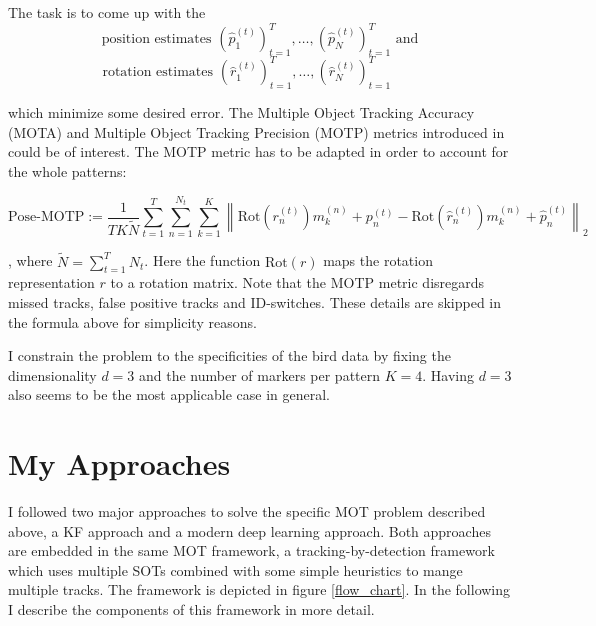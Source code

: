 \documentclass[12pt,a4paper]{article}
\begin{document}
The task is to come up with the $$ \text{ position estimates } \left(\hat{p}^{(t)}_1\right)_{t=1}^T, \dots,\left(\hat{p}^{(t)}_N\right)_{t=1}^T \text{ and }$$ $$\text{ rotation estimates } \left(\hat{r}^{(t)}_1\right)_{t=1}^T, \dots,\left(\hat{r}^{(t)}_N\right)_{t=1}^T \qquad ~$$ 
\begin{sloppypar}
which minimize some desired error. The Multiple Object Tracking Accuracy (MOTA) and Multiple Object Tracking Precision (MOTP) metrics introduced in \cite{mot_metrics} could be of interest. The MOTP metric has to be adapted in order to account for the whole patterns:
\end{sloppypar}

\begin{equation}
	\text{Pose-MOTP} := \frac{1}{TK\tilde{N}}\sum_{t=1}^{T}\sum_{n=1}^{N_t} \sum_{k=1}^{K} \left\| \text{Rot}(r^{(t)}_n)m^{(n)}_k + p^{(t)}_n - \text{Rot}(\hat{r}^{(t)}_n)m^{(n)}_k + \hat{p}^{(t)}_n \right\|_2
\end{equation}

, where $\tilde{N}= \sum_{t=1}^{T}N_t$. Here the function $\text{Rot}(r)$ maps the rotation representation $r$ to a rotation matrix. Note that the MOTP metric disregards missed tracks, false positive tracks and ID-switches. These details are skipped in the formula above for simplicity reasons.

I constrain the problem to the specificities of the bird data by fixing the dimensionality $d=3$ and the number of markers per pattern $K=4$. Having $d=3$ also seems to be the most applicable case in general.


\section{My Approaches}
\label{approaches}
I followed two major approaches to solve the specific MOT problem described above, a KF approach and a modern deep learning approach. Both approaches are embedded in the same MOT framework, a tracking-by-detection framework which uses multiple SOTs combined with some simple heuristics to mange multiple tracks. The framework is depicted in figure \ref{flow_chart}. In the following I describe the components of this framework in more detail.
\end{document}
